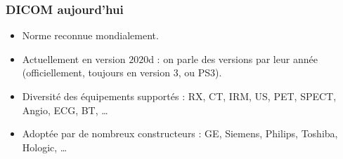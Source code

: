 	\frame
	{
		\frametitle{DICOM aujourd'hui}
		\begin{itemize}
			\item<1-> Norme reconnue mondialement.
			\item<2-> Actuellement en version $2020$d : on parle des versions par leur ann\'ee (officiellement, toujours en version 3, ou PS3).
			\item<3-> Diversit\'e des \'equipements support\'es : RX, CT, IRM, US, PET, SPECT, Angio, ECG, BT, \ldots
			\item<4-> Adopt\'ee par de nombreux constructeurs : GE, Siemens, Philips, Toshiba, Hologic, \ldots
		\end{itemize}
	}
